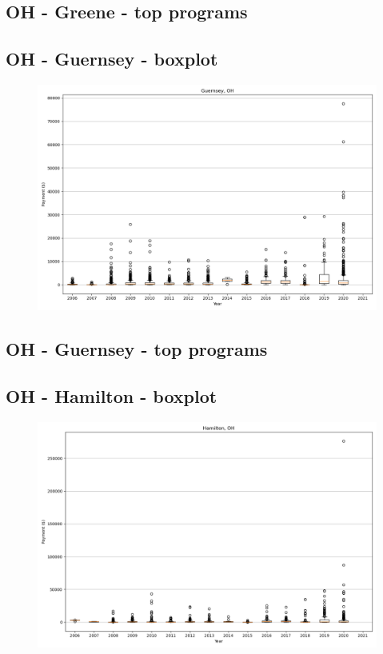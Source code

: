 \subsection*{OH - Greene - top programs}

\newpage
\subsection*{OH - Guernsey - boxplot}
\begin{figure}[h]
\centering
\includegraphics[width=7in]{../output/boxplots/counties/Guernsey-OH_boxplot.png}
\end{figure}


\subsection*{OH - Guernsey - top programs}

\newpage
\subsection*{OH - Hamilton - boxplot}
\begin{figure}[h]
\centering
\includegraphics[width=7in]{../output/boxplots/counties/Hamilton-OH_boxplot.png}
\end{figure}



